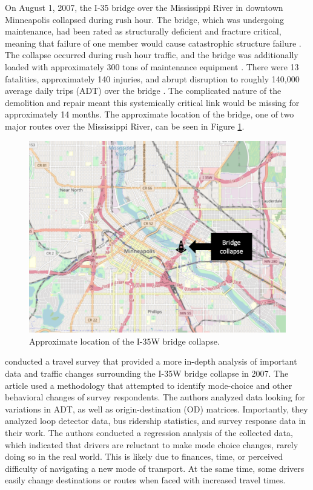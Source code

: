 On August 1, 2007, the I-35 bridge over the Mississippi River in downtown
Minneapolis collapsed
during rush hour. The bridge, which was undergoing maintenance, had been
rated as structurally
deficient and fracture critical, meaning that failure of one member would
cause catastrophic structure failure \citep{schaper2017}.
The collapse occurred during rush hour traffic, and the bridge
was additionally loaded
with approximately 300 tons of maintenance equipment \citep{schaper2017}.
There were 13
fatalities,
approximately 140 injuries, and abrupt disruption to roughly 140,000
average daily trips (ADT)
over the bridge \citep{zhu2010}. The complicated nature of the demolition
and repair meant
this systemically critical link would be missing for approximately 14
months. The approximate
location of the bridge, one of two major routes over the Mississippi
River, can be seen in Figure \ref{fig:i35}.

\begin{figure}

{\centering \includegraphics[width=0.75\linewidth]{figures/chapter2/I-35W.png}

}

\caption{Approximate location of the I-35W bridge collapse.}\label{fig:i35}
\end{figure}

\citet{zhu2010} conducted a travel survey that provided a more in-depth
analysis of important data
and traffic changes surrounding the I-35W bridge collapse in 2007. The
article used a methodology
that attempted to identify mode-choice and other behavioral changes of
survey respondents. The
authors analyzed data looking for variations in ADT, as well as origin-destination (OD) matrices.
Importantly, they analyzed loop detector data, bus ridership statistics, and survey response data in their work. The
authors conducted a regression analysis of the collected data,
which indicated that drivers are reluctant to make mode choice changes,
rarely doing so in the real world. This is
likely due to finances, time, or perceived difficulty of
navigating a new mode of
transport. At the same time, some drivers easily change destinations or routes when faced
with increased travel
times.

